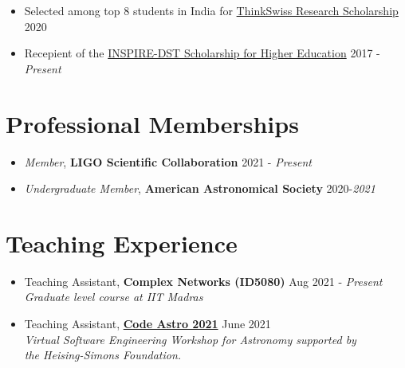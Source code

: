 \documentclass[margin, centered]{res}
\begin{document}
\begin{resume}
\begin{itemize}[leftmargin=*]
 \item Selected among top 8 students in India for \href{https://swissnex.org/india/thinkswiss/}{ThinkSwiss Research Scholarship} \hfill 2020

 \item Recepient of the \href{http://www.inspire-dst.gov.in/scholarship.html}{INSPIRE-DST Scholarship for Higher Education}  \hfill 2017 - \textit{Present}
\end{itemize}


\section{Professional Memberships}
\begin{itemize}[leftmargin=*]
    \item \textit{Member}, \textbf{\color{C3} LIGO Scientific Collaboration} \hfill 2021 -   \textit{Present}
    \item \textit{Undergraduate Member}, \textbf{\color{C3} American Astronomical Society} \hfill 2020-\textit{2021}\\
\end{itemize}

\section{Teaching Experience}
\begin{itemize}[leftmargin=*]
    \item {\color{C2} Teaching Assistant}, \textbf{\color{C3}Complex Networks (ID5080)} \hfill Aug 2021 - \textit{Present} \\
    \emph{Graduate level course at IIT Madras} 
    \item {\color{C2} Teaching Assistant}, \href{https://semaphorep.github.io/codeastro/}{\textbf{Code Astro 2021}}   \hfill June 2021  \\
    \emph{Virtual Software Engineering Workshop for Astronomy supported by \\ the Heising-Simons Foundation.}
\end{itemize}


\end{resume}
\end{document}
